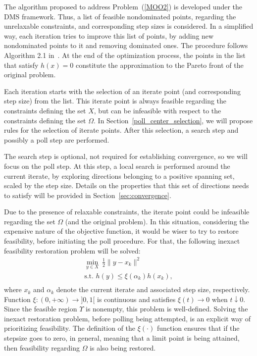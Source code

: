 \documentclass[12pt]{article}
\begin{document}
The algorithm proposed to address Problem~(\ref{MOO2}) is
developed under the DMS framework. Thus, a list of feasible
nondominated points, regarding the unrelaxable constraints, and
corresponding step sizes is considered. In a simplified way, each
iteration tries to improve this list of points, by adding new
nondominated points to it and removing dominated ones. The
procedure follows Algorithm 2.1 in~\cite{custodio2011}. At the end
of the optimization process, the points in the list that satisfy
$h(x)=0$ constitute the approximation to the Pareto front of the
original problem.

Each iteration starts with the selection of an iterate point (and
corresponding step size) from the list. This iterate point is
always feasible regarding the constraints defining the set $X$,
but can be infeasible with respect to the constraints defining the
set $\Omega$. In Section~\ref{poll_center_selection}, we will
propose rules for the selection of iterate points. After this
selection, a search step and possibly a poll step are performed.

The search step is optional, not required for establishing
convergence, so we will focus on the poll step. At this step, a
local search is performed around the current iterate, by exploring
directions belonging to a positive spanning set, scaled by the
step size. Details on the properties that this set of directions
needs to satisfy will be provided in
Section~\ref{sec:convergence}.

Due to the presence of relaxable constraints, the iterate point
could be infeasible regarding the set $\Omega$ (and the original
problem). In this situation, considering the expensive nature of
the objective function, it would be wiser to try to restore
feasibility, before initiating the poll procedure. For that, the
following inexact feasibility restoration problem will be solved:
\begin{equation*}
\begin{array}{l}
\displaystyle \min_{y\in X}\  \frac{1}{2}\|y-x_k\|^2\\
\text{s.t. } h(y)\leq \xi(\alpha_k) h(x_k),\\
\end{array}\label{IRP}
\end{equation*}
where $x_k$ and $\alpha_k$ denote the current iterate and
associated step size, respectively. Function $\xi:(0,+\infty)\to
]0,1[$ is continuous and satisfies $\xi(t)\to 0$ when $t\downarrow
0$. Since the feasible region $\Upsilon$ is nonempty, this problem
is well-defined. Solving the inexact restoration problem, before
polling being attempted, is an explicit way of prioritizing
feasibility. The definition of the $\xi(\cdot)$ function ensures
that if the stepsize goes to zero, in general, meaning that a
limit point is being attained, then feasibility regarding $\Omega$
is also being restored.
\end{document}

